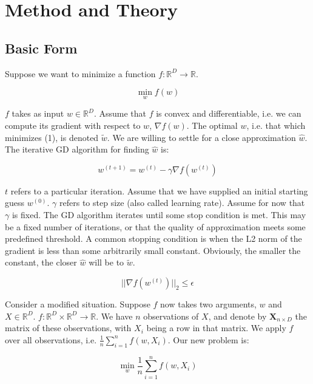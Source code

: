 \documentclass{article}
\begin{document}
\section{Method and Theory}

\subsection{Basic Form}

Suppose we want to minimize a function $f: \mathbb{R}^D \to \mathbb{R}$. 

\begin{equation}
	\min_w f(w)
\end{equation}

$f$ takes as input $w \in \mathbb{R}^D$. Assume
that $f$ is convex and differentiable, i.e. we can compute its gradient with
respect to $w$, $\nabla f(w)$. The optimal $w$, i.e. that which minimizes (1),
is denoted $\tilde{w}$. We are willing to settle for a close approximation
$\hat{w}$. The iterative GD algorithm for finding $\hat{w}$ is:

\begin{equation}
	w^{(t+1)} = w^{(t)} - \gamma \nabla f(w^{(t)})
\end{equation}

$t$ refers to a particular iteration. Assume that we have supplied an initial
starting guess $w^{(0)}$. $\gamma$ refers to step size (also called
learning rate). Assume for now that $\gamma$ is fixed. The GD algorithm iterates
until some stop condition is met. This may be a fixed number of iterations, or
that the quality of approximation meets some predefined threshold. 
A common stopping condition is when the L2 norm of the gradient
is less than some arbitrarily small constant. Obviously, the smaller the
constant, the closer $\hat{w}$ will be to $\tilde{w}$.

\begin{equation}
	||\nabla f(w^{(t)})||_2 \leq \epsilon
\end{equation}

Consider a modified situation. Suppose $f$ now takes two arguments, $w$ and $X
\in \mathbb{R}^D$. $f : \mathbb{R}^D \times \mathbb{R}^D \rightarrow
\mathbb{R}$. We have $n$ observations of $X$, and denote by
$\bm{X}_{n \times D}$ the matrix of these observations, with $X_i$ being a
row in that matrix. We apply $f$ over all observations, i.e. $\frac{1}{n} \sum_{i=1}^n f(w, X_i)$. Our new
problem is:

\begin{equation}
	\min_w  \frac{1}{n} \sum_{i=1}^n f(w, X_i)
\end{equation}
\end{document}
